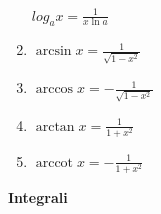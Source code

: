 \begin{center}
\begin{small}
\begin{enumerate}
\begin{math}
                log_a x = \frac{1}{x \ln a}
            \end{math}
            \item \begin{math}
                \arcsin x = \frac{1}{\sqrt {1 - x^2}}
            \end{math}
            \item \begin{math}
                \arccos x = - \frac{1}{\sqrt{1 - x^2}}
            \end{math}
            \item \begin{math}
                \arctan x = \frac{1}{1 + x^2}
            \end{math}
            \item \begin{math}
                \operatorname{arccot}x = -\frac{1}{1 + x^2}
            \end{math}
        \end{enumerate}
    \end{small}
\end{center}
\textbf{Integrali}
